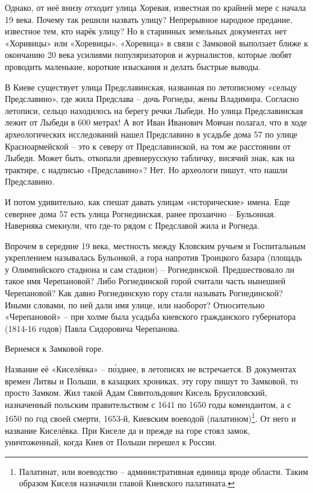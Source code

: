 Однако, от неё внизу отходит улица Хоревая, известная по крайней мере с начала 19 века. Почему так решили назвать улицу? Непрерывное народное предание, известное тем, кто нарёк улицу? Но в старинных земельных документах нет «Хоривицы» или «Хоревицы». «Хоревица» в связи с Замковой выползает ближе к окончанию 20 века усилиями популяризаторов и журналистов, которые любят проводить маленькие, короткие изыскания и делать быстрые выводы.

В Киеве существует улица Предславинская, названная по летописному «сельцу Предславино», где жила Предслава – дочь Рогнеды, жены Владимира. Согласно летописи, сельцо находилось на берегу речки Лыбеди. Но улица Предславинская лежит от Лыбеди в 600 метрах! А вот Иван Иванович Мовчан полагал, что в ходе археологических исследований нашел Предславино в усадьбе дома 57 по улице Красноармейской – это к северу от Предславинской, на том же расстоянии от Лыбеди. Может быть, откопали древнерусскую табличку, висячий знак, как на трактире, с надписью «Предславино»? Нет. Но археологи пишут, что нашли Предславино.

И потом удивительно, как спешат давать улицам «исторические» имена. Еще севернее дома 57 есть улица Рогнединская, ранее прозаично – Бульонная. Наверняка смекнули, что где-то рядом с Предславой жила и Рогнеда. 

Впрочем в середине 19 века, местность между Кловским ручьем и Госпитальным укреплением называлась Бульонкой, а гора напротив Троицкого базара (площадь у Олимпийского стадиона и сам стадион) – Рогнединской. Предшествовало ли такое имя Черепановой? Либо Рогнединской горой считали часть нынешней Черепановой? Как давно Рогнединскую гору стали называть Рогнединской? Иными словами, по ней дали имя улице, или наоборот? Относительно «Черепановой» – при холме была усадьба киевского гражданского губернатора (1814-16 годов) Павла Сидоровича Черепанова.

Вернемся к Замковой горе. 

Название её «Киселёвка» – п\'озднее, в летописях не встречается. В документах времен Литвы и Польши, в казацких хрониках, эту гору пишут то Замковой, то просто Замком. Жил такой Адам Свянтольдович Кисель Брусиловский, назначенный польским правительством с 1641 по 1650 годы комендантом, а с 1650 по год своей смерти, 1653-й, Киевским воеводой (палатином)\footnote{Палатинат, или воеводство – административная единица вроде области. Таким образом Киселя назначили главой Киевского палатината.}. От него и название Киселёвка. При Киселе да и прежде на горе стоял замок, уничтоженный, когда Киев от Польши перешел к России.

